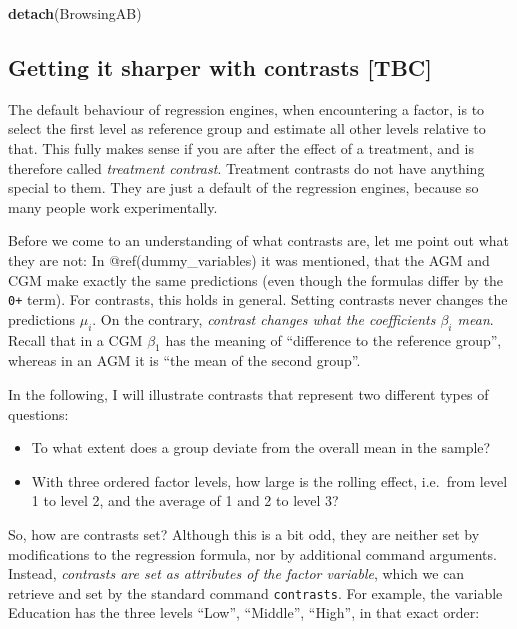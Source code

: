 \documentclass[]{svmono}
\newenvironment{Shaded}{\begin{snugshade}}{\end{snugshade}}
\newcommand{\KeywordTok}[1]{\textcolor[rgb]{0.13,0.29,0.53}{\textbf{#1}}}
\newcommand{\NormalTok}[1]{#1}
\providecommand{\tightlist}{%
  \setlength{\itemsep}{0pt}\setlength{\parskip}{0pt}}
\begin{document}
\begin{Shaded}
\begin{Highlighting}[]
\KeywordTok{detach}\NormalTok{(BrowsingAB)}
\end{Highlighting}
\end{Shaded}

\subsection{Getting it sharper with contrasts
{[}TBC{]}}\label{contrasts}

The default behaviour of regression engines, when encountering a factor,
is to select the first level as reference group and estimate all other
levels relative to that. This fully makes sense if you are after the
effect of a treatment, and is therefore called \emph{treatment
contrast}. Treatment contrasts do not have anything special to them.
They are just a default of the regression engines, because so many
people work experimentally.

Before we come to an understanding of what contrasts are, let me point
out what they are not: In @ref(dummy\_variables) it was mentioned, that
the AGM and CGM make exactly the same predictions (even though the
formulas differ by the \texttt{0+} term). For contrasts, this holds in
general. Setting contrasts never changes the predictions \(\mu_i\). On
the contrary, \emph{contrast changes what the coefficients \(\beta_i\)
mean}. Recall that in a CGM \(\beta_1\) has the meaning of ``difference
to the reference group'', whereas in an AGM it is ``the mean of the
second group''.

In the following, I will illustrate contrasts that represent two
different types of questions:

\begin{itemize}
\tightlist
\item
  To what extent does a group deviate from the overall mean in the
  sample?
\item
  With three ordered factor levels, how large is the rolling effect,
  i.e.~from level 1 to level 2, and the average of 1 and 2 to level 3?
\end{itemize}

So, how are contrasts set? Although this is a bit odd, they are neither
set by modifications to the regression formula, nor by additional
command arguments. Instead, \emph{contrasts are set as attributes of the
factor variable}, which we can retrieve and set by the standard command
\texttt{contrasts}. For example, the variable Education has the three
levels ``Low'', ``Middle'', ``High'', in that exact order:
\end{document}
